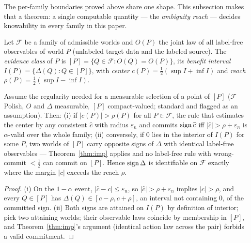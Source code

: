 
The per-family boundaries proved above share one shape. This subsection makes that a
theorem: a single computable quantity --- the \emph{ambiguity reach} --- decides
knowability in every family in this paper.

\begin{definition}\label{def:reach}
Let $\mathcal F$ be a family of admissible worlds and $O(P)$ the joint law of all
label-free observables of world $P$ (unlabeled target data and the labeled source).
The \emph{evidence class} of $P$ is $[P]=\{Q\in\mathcal F: O(Q)=O(P)\}$, its
\emph{benefit interval} $I(P)=\{\Delta(Q):Q\in[P]\}$, with \emph{center}
$c(P)=\tfrac12(\sup I+\inf I)$ and \emph{reach} $\rho(P)=\tfrac12(\sup I-\inf I)$.
\end{definition}

\begin{proposition}[Knowability $=$ margin beyond reach]\label{thm:unify}
Assume the regularity needed for a measurable selection of a point of $[P]$
($\mathcal F$ Polish, $O$ and $\Delta$ measurable, $[P]$ compact-valued; standard and
flagged as an assumption). Then:
\textup{(i)} if $|c(P)|>\rho(P)$ for all $P\in\mathcal F$, the rule that estimates the
center by any consistent $\widehat c$ with radius $\varepsilon_n$ and commits
$\operatorname{sign}\widehat c$ iff $|\widehat c|>\rho+\varepsilon_n$ is $\alpha$-valid over the whole
family;
\textup{(ii)} conversely, if $0$ lies in the interior of $I(P)$ for some $P$, two worlds
of $[P]$ carry opposite signs of $\Delta$ with identical label-free observables ---
Theorem~\ref{thm:imp} applies and no label-free rule with wrong-commit
$<\tfrac12$ can commit on $[P]$.
Hence $\operatorname{sign}\Delta$ is identifiable on $\mathcal F$ exactly where the margin $|c|$
exceeds the reach $\rho$.
\end{proposition}
\begin{proof}
(i) On the $1-\alpha$ event, $|\widehat c-c|\le\varepsilon_n$, so
$|\widehat c|>\rho+\varepsilon_n$ implies $|c|>\rho$, and every $Q\in[P]$ has
$\Delta(Q)\in[c-\rho,c+\rho]$, an interval not containing $0$, of the committed sign.
(ii) Both signs are attained on $I(P)$ by definition of interior; pick two attaining
worlds; their observable laws coincide by membership in $[P]$, and
Theorem~\ref{thm:imp}'s argument (identical action law across the pair) forbids a valid
commitment.
\end{proof}

